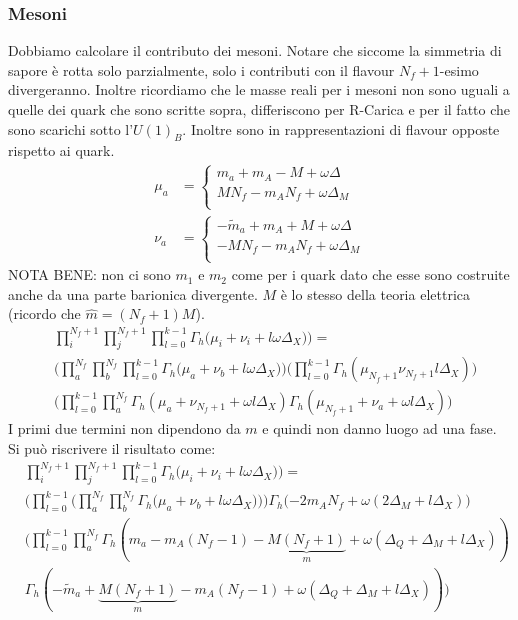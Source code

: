 \documentclass[a4paper,12pt]{article}
\begin{document}
\subsubsection{Mesoni}
Dobbiamo calcolare il contributo dei mesoni. Notare che siccome la simmetria di sapore è rotta solo parzialmente, solo i contributi con il flavour $N_f + 1$-esimo divergeranno. Inoltre ricordiamo che le masse reali per i mesoni non sono uguali a quelle dei quark che sono scritte sopra, differiscono per R-Carica e per il fatto che sono scarichi sotto l'$U(1)_B$. Inoltre sono in rappresentazioni di flavour opposte rispetto ai quark.
\begin{align*}
	\mu_a &  = \begin{cases}
	m_a + m_A - M + \omega \Delta \\
	M N_f - m_A N_f + \omega \Delta_M\\
	\end{cases}
	\\
\nu_a & = 	\begin{cases}
	- \tilde{m}_a + m_A + M + \omega \Delta \\
	- M N_f - m_A N_f + \omega \Delta_M \\
	\end{cases}
\end{align*}
NOTA BENE: non ci sono $m_1$ e $m_2$ come per i quark dato che esse sono costruite anche da una parte barionica divergente. 
$M$ è lo stesso della teoria elettrica (ricordo che $\hat{m} = (N_f+1) M$).
\begin{align*}
 & \prod_i^{N_f+1} \prod_j^{N_f+1}  \prod_{l=0}^{k-1}    \Gamma_h \big( \mu_i+  \nu_i + l \omega \Delta_X) \big)  = \\ &
\bigg( \prod_a^{N_f} \prod_b^{N_f}  \prod_{l=0}^{k-1} \Gamma_h \big(   \mu_a + \nu_b + l \omega \Delta_X \big)  \bigg)   \bigg( \prod_{l=0}^{k-1} \Gamma_h( \mu_{N_f+1} \nu_{N_f+1}  l \Delta_X) \bigg) \\
&  \bigg(  \prod_{l=0}^{k-1} \prod_a^{N_f} \Gamma_h ( \mu_a + \nu_{N_f+1} + \omega l \Delta_X) \Gamma_h(  \mu_{N_f+1} + \nu_{a} + \omega l \Delta_X)  \bigg) 
\end{align*}
I primi due termini non dipendono da $m$ e quindi non danno luogo ad una fase. Si può riscrivere il risultato come: 
\begin{align*}
& \prod_i^{N_f+1} \prod_j^{N_f+1}  \prod_{l=0}^{k-1}   \Gamma_h \big( \mu_i+  \nu_i + l \omega \Delta_X) \big)  = \\
& \bigg(  \prod_{l=0}^{k-1}  \bigg ( \prod_a^{N_f} \prod_b^{N_f} \Gamma_h \big( \mu_a + \nu_b + l \omega \Delta_X) \big)  \bigg)\Gamma_h( - 2 m_A N_f + \omega ( 2 \Delta_M +  l \Delta_X) \bigg)  \\
 &  \bigg(  \prod_{l=0}^{k-1} \prod_a^{N_f} \Gamma_h (m_a - m_A (N_f-1) - \underbrace{M(N_f+1)}_m  + \omega ( \Delta_Q + \Delta_M + l \Delta_X))\\
 & \Gamma_h(  - \tilde{m}_a + \underbrace{M (N_f +1)}_m - m_A ( N_f-1) + \omega ( \Delta_Q + \Delta_M + l \Delta_X) ) \bigg) 
\end{align*}
\end{document}
